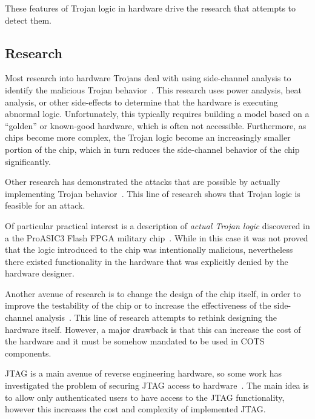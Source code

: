\documentclass[11pt,letterpaper]{article}
\begin{document}
These features of Trojan logic in hardware drive the research that
attempts to detect them. 

\subsection{Research}

Most research into hardware Trojans deal with using side-channel
analysis to identify the malicious Trojan behavior~\cite{Lee2005,
  Agrawal2007, Banga2008, Banga2008a, Jin2008, Du2010, Narasimhan2011,
  Narasimhan2012, Cao2013, Davoodi2013, Dworak2013, Forte2013,
  Liu2013, Liu2014, Bao2015}. This research uses power analysis, heat
analysis, or other side-effects to determine that the hardware is
executing abnormal logic. Unfortunately, this typically requires
building a model based on a ``golden'' or known-good hardware, which
is often not accessible. Furthermore, as chips become more complex,
the Trojan logic become an increasingly smaller portion of the chip,
which in turn reduces the side-channel behavior of the chip
significantly. 

Other research has demonstrated the attacks that are possible by
actually implementing Trojan behavior~\cite{King2008, Jin2010,
  Sturton2011, Liu2013, Jin2014, Zhang2014}. This line of research
shows that Trojan logic is feasible for an attack.

Of particular practical interest is a description of \emph{actual
  Trojan logic} discovered in a the ProASIC3 Flash FPGA military
chip~\cite{Skorobogatov2012}. While in this case it was not proved
that the logic introduced to the chip was intentionally malicious,
nevertheless there existed functionality in the hardware that was
explicitly denied by the hardware designer. 

Another avenue of research is to change the design of the chip itself,
in order to improve the testability of the chip or to increase the
effectiveness of the side-channel analysis~\cite{Chakraborty2008,
  Li2008, Salmani2009, Hicks2010, Rosenfeld2011, Waksman2011,
  Bhunia2013, Davoodi2013, Rajendran2013, Rolt2014}. This line of
research attempts to rethink designing the hardware itself. However, a
major drawback is that this can increase the cost of the hardware and
it must be somehow mandated to be used in COTS components. 

JTAG is a main avenue of reverse engineering hardware, so some work
has investigated the problem of securing JTAG access to
hardware~\cite{Rosenfeld2010, Ren2015}. The main idea is to allow only
authenticated users to have access to the JTAG functionality, however
this increases the cost and complexity of implemented JTAG. 
\end{document}
